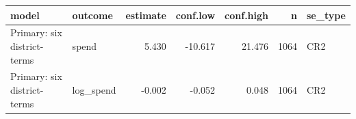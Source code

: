 
\begin{tabular}{llrrrrl}
\toprule
model & outcome & estimate & conf.low & conf.high & n & se\_type\\
\midrule
Primary: six district-terms & spend & 5.430 & -10.617 & 21.476 & 1064 & CR2\\
Primary: six district-terms & log\_spend & -0.002 & -0.052 & 0.048 & 1064 & CR2\\
\bottomrule
\end{tabular}
